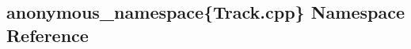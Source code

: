 \hypertarget{namespaceanonymous__namespace_02Track_8cpp_03}{}\subsection{anonymous\+\_\+namespace\{Track.\+cpp\} Namespace Reference}
\label{namespaceanonymous__namespace_02Track_8cpp_03}
